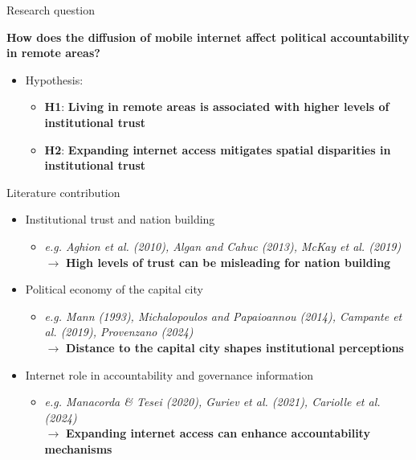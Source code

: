 \documentclass[10pt]{beamer}
\begin{document}
\begin{frame}{Research question}

\centering \textbf{How does the diffusion of mobile internet affect political accountability in remote areas?}
\vspace{15pt}
\begin{itemize}\setlength\itemsep{1em}
    \item Hypothesis:
    \vspace{10pt}
    \begin{itemize}
    \item {}\textcolor{rougeprez}{\textbf{H1}}: \textbf{Living in remote areas is associated with higher levels of institutional trust}
        \vspace{10pt}
    \item {}\textcolor{rougeprez}{\textbf{H2}}: \textbf{Expanding internet access mitigates spatial disparities in institutional trust}
    \end{itemize}
\end{itemize}
\end{frame}



\begin{frame}{Literature contribution}

\begin{itemize}\setlength\itemsep{1em}
    \item Institutional trust and nation building
    \begin{itemize}
        \item \textit{e.g. Aghion et al. (2010), Algan and Cahuc (2013), McKay et al. (2019)}\\
        $\rightarrow{}$ \textbf{High levels of trust can be misleading for nation building}
    \end{itemize}    
    \item Political economy of the capital city
\begin{itemize}
    \item \textit{e.g.  Mann (1993), Michalopoulos and Papaioannou (2014), Campante et al. (2019), Provenzano (2024)}\\
    $\rightarrow{}$ \textbf{Distance to the capital city shapes institutional perceptions}
\end{itemize}
\item Internet role in accountability and governance information
    \begin{itemize}
        \item \textit{e.g. Manacorda \& Tesei (2020), Guriev et al. (2021), Cariolle et al. (2024)}\\
        $\rightarrow{}$ \textbf{Expanding internet access can enhance accountability mechanisms}
    \end{itemize}
    
\end{itemize}
\end{frame}
\end{document}
